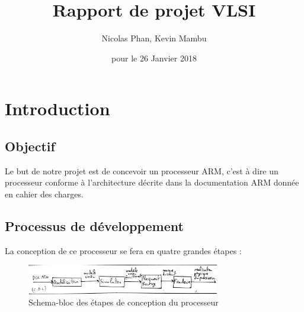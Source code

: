 \documentclass{article}
\title{Rapport de projet VLSI}
\author{Nicolas Phan, Kevin Mambu}
\date{pour le 26 Janvier 2018}
\begin{document}
\pagestyle{headings}
\maketitle
\tableofcontents
\newpage

\section{Introduction}

\subsection{Objectif}

Le but de notre projet est de concevoir un processeur ARM, c'est à dire un processeur conforme
à l'architecture décrite dans la documentation ARM donnée en cahier des charges.

\subsection{Processus de développement}

La conception de ce processeur se fera en quatre grandes étapes :

\begin{figure}[H]
\includegraphics[width=0.75\textwidth]{pics/conception.png}
\centering
\caption{Schema-bloc des étapes de conception du processeur} 
\label{conception}
\end{figure}
\end{document}
